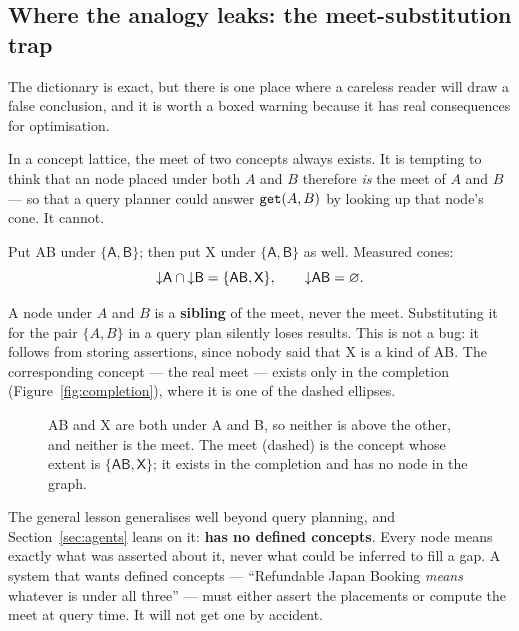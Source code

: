 \subsection{Where the analogy leaks: the meet-substitution trap}
\label{sec:meet-trap}

The dictionary is exact, but there is one place where a careless reader will
draw a false conclusion, and it is worth a boxed warning because it has real
consequences for optimisation.

In a concept lattice, the meet of two concepts always exists. It is tempting
to think that an \odag{} node placed under both $A$ and $B$ therefore
\emph{is} the meet of $A$ and $B$ --- so that a query planner could answer
$\texttt{get}(A,B)$ by looking up that node's cone. It cannot.

\begin{measured}
Put \textsf{AB} under $\{\textsf{A}, \textsf{B}\}$; then put \textsf{X} under
$\{\textsf{A}, \textsf{B}\}$ as well. Measured cones:
\[
  \mathord{\downarrow}\textsf{A} \cap \mathord{\downarrow}\textsf{B} = \{\textsf{AB}, \textsf{X}\},
  \qquad
  \mathord{\downarrow}\textsf{AB} = \varnothing .
\]
\end{measured}

\begin{pitfall}
A node under $A$ and $B$ is a \textbf{sibling} of the meet, never the meet.
Substituting it for the pair $\{A, B\}$ in a query plan silently loses
results. This is not a bug: it follows from \odag{} storing assertions, since
nobody said that \textsf{X} is a kind of \textsf{AB}. The corresponding
\fca{} concept --- the real meet --- exists only in the completion
(Figure~\ref{fig:completion}), where it is one of the dashed ellipses.
\end{pitfall}

\begin{figure}[h]
\centering
{}
\caption{\textsf{AB} and \textsf{X} are both under \textsf{A} and \textsf{B},
so neither is above the other, and neither is the meet. The meet (dashed) is
the concept whose extent is $\{\textsf{AB}, \textsf{X}\}$; it exists in the
completion and has no node in the graph.}
\label{fig:meettrap}
\end{figure}

The general lesson generalises well beyond query planning, and
Section~\ref{sec:agents} leans on it: \textbf{\odag{} has no defined
concepts}. Every node means exactly what was asserted about it, never what
could be inferred to fill a gap. A system that wants defined concepts ---
``\textsf{Refundable Japan Booking} \emph{means} whatever is under all three''
--- must either assert the placements or compute the meet at query time. It
will not get one by accident.
